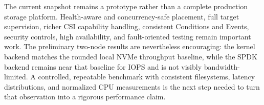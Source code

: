 \documentclass[10pt,a4paper,twocolumn]{article}
\begin{document}
The current snapshot remains a prototype rather than a complete production
storage platform. Health-aware and concurrency-safe placement, full target
supervision, richer CSI capability handling, consistent Conditions and Events,
security controls, high availability, and fault-oriented testing remain
important work. The preliminary two-node results are nevertheless encouraging:
the kernel backend matches the rounded local NVMe throughput baseline, while
the SPDK backend remains near that baseline for IOPS and is not visibly
bandwidth-limited. A controlled, repeatable benchmark with consistent
filesystems, latency distributions, and normalized CPU measurements is the
next step needed to turn that observation into a rigorous performance claim.
\end{document}
